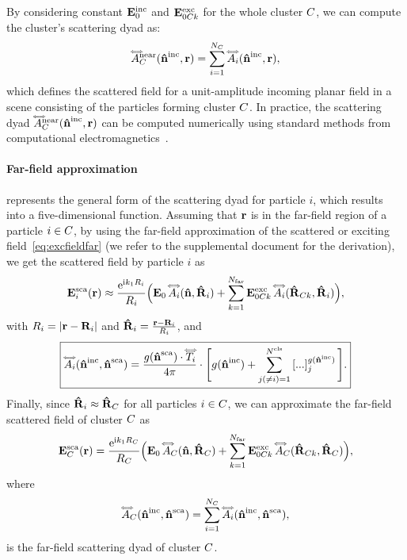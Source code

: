 %
By considering constant $\mathbf{E}^\text{inc}_0$ and $\mathbf{E}^\text{exc}_{0C k}$ for the whole cluster $C$, we can compute the cluster's scattering dyad as:
%
\begin{equation}
    \accentset{\Longleftrightarrow}{A}_C^\text{near}(\mathbf{\hat{n}}^{\text{inc}},\mathbf{r}) = \sum_{i=1}^{N_C} \accentset{\Longleftrightarrow}{A}_i(\mathbf{\hat{n}}^{\text{inc}},\mathbf{r}),
    \label{eq:scatdyadcluster_near}
\end{equation}
%
which defines the scattered field for a unit-amplitude incoming planar field in a scene consisting of the particles forming cluster $C$.
In practice, the scattering dyad $\accentset{\Longleftrightarrow}{A}_C^\text{near}(\mathbf{\hat{n}}^{\text{inc}},\mathbf{r})$ can be computed numerically using standard methods from computational electromagnetics~\cite{mishchenko2014electromagnetic}.


\paragraph{Far-field approximation}
 represents the general form of the scattering dyad for particle $i$, which results into a five-dimensional function. Assuming that $\mathbf{r}$ is in the far-field region of a particle $i\in C$, by using the far-field approximation of the scattered or exciting field~\eqref{eq:excfieldfar} (we refer to the supplemental document for the derivation), we get the scattered field by particle $i$ as
%
\begin{align}
    \mathbf{E}^\text{sca}_i(\mathbf{r}) \approx \frac{\mathrm{e}^{\text{i} k_1 R_i}}{R_i} \Big(\mathbf{E}_0 \,  \accentset{\Longleftrightarrow}{A}_i(\mathbf{\hat{n}},\mathbf{\hat{R}}_i) 
    + \sum_{k=1}^{N_{\text{far}}} \mathbf{E}^\text{exc}_{0C k} \, \accentset{\Longleftrightarrow}{A}_i(\mathbf{\hat{R}}_{C k},\mathbf{\hat{R}}_i) \Big),
    \label{eq:farscatfield}
\end{align}
%
with $R_i=|\mathbf{r}-\mathbf{R}_i|$ and $\mathbf{\hat{R}}_i=\frac{\mathbf{r}-\mathbf{R}_i}{R_i}$, and %
\begin{equation}
    \label{eq:farscatdyad}
    \boxed{%
        \ScaDyad_i(\dwi,\dws) = \frac{g(\dws)\cdot \dyad{T}_i}{4\pi} \cdot\Bigg[ \sGreenProp(\dwi) + \sum_{j(\neq i)=1}^\Ncls \left[...\right]_j^{\sGreenProp(\dwi)} \Bigg].
    }
\end{equation}
%
Finally, since $\mathbf{\hat{R}}_i\approx\mathbf{\hat{R}}_C$ for all particles $i\in C$, we can approximate the far-field scattered field of cluster $C$ as
%
\begin{equation}
    \mathbf{E}^\text{sca}_C(\mathbf{r}) = \frac{\mathrm{e}^{\text{i} k_1 R_C}}{R_C}\Big( \mathbf{E}_0 \,  \accentset{\Longleftrightarrow}{A}_C(\mathbf{\hat{n}},\mathbf{\hat{R}}_C) + \sum_{k=1}^{N_{\text{far}}} \mathbf{E}^\text{exc}_{0C k} \, \accentset{\Longleftrightarrow}{A}_C(\mathbf{\hat{R}}_{C k},\mathbf{\hat{R}}_C) \Big),
    \label{eq:farscatfieldcluster}
\end{equation}
%
where
%
\begin{equation}
   \accentset{\Longleftrightarrow}{A}_C(\mathbf{\hat{n}}^{\text{inc}},\mathbf{\hat{n}}^{\text{sca}}) = \sum_{i=1}^{N_C}\accentset{\Longleftrightarrow}{A}_i(\mathbf{\hat{n}}^{\text{inc}},\mathbf{\hat{n}}^{\text{sca}}),
   \label{eq:farscatdyadC}
\end{equation}
%
is the far-field scattering dyad of cluster $C$.

